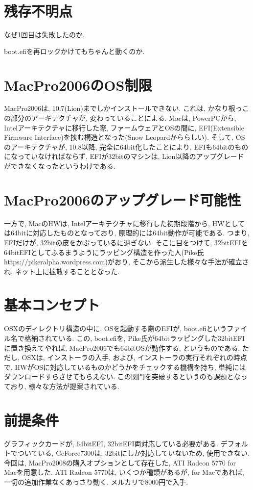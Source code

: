 \documentclass{jsarticle}
\begin{document}
\section{残存不明点}
なぜ1回目は失敗したのか. 

boot.efiを再ロックかけてもちゃんと動くのか. 

\section{MacPro2006のOS制限}
MacPro2006は, 10.7(Lion)までしかインストールできない. これは, かなり根っこの部分のアーキテクチャが, 変わっていることによる. 
Macは, PowerPCから, Intelアーキテクチャに移行した際, ファームウェアとOSの間に, EFI(Extensible Firmware Interface)を挟む構造となった(Snow Leopardかららしい). 
そして, OSのアーキテクチャが, 10.8以降, 完全に64bit化したことにより, EFIも64bitのものになっていなければならず, EFIが32bitのマシンは, Lion以降のアップグレードができなくなったというわけである. 

\section{MacPro2006のアップグレード可能性}
一方で, MacのHWは, Intelアーキテクチャに移行した初期段階から, HWとしては64bitに対応したものとなっており, 原理的には64bit動作が可能である. 
つまり, EFIだけが, 32bitの皮をかぶっているに過ぎない. そこに目をつけて, 32bitEFIを64bitEFIとしてふるまうようにラッピング構造を作った人(Pike氏 https://pikeralpha.wordpress.com)がおり, 
そこから派生した様々な手法が確立され, ネット上に拡散することとなった. 

\section{基本コンセプト}
OSXのディレクトリ構造の中に, OSを起動する際のEFIが, boot.efiというファイル名で格納されている. 
この, boot.efiを, Pike氏が64bitラッピングした32bitEFIに置き換えてやれば, MacPro2006でも64bitOSが動作する, というものである. 
ただし, OSXは, インストーラの入手, および, インストーラの実行それぞれの時点で, HWがOSに対応しているものかどうかをチェックする機構を持ち, 単純にはダウンロードすらさせてもらえない. 
この関門を突破するというのも課題となっており, 様々な方法が提案されている. 

\section{前提条件}
グラフィックカードが, 64bitEFI, 32bitEFI両対応している必要がある. 
デフォルトでついている, GeForce7300は, 32bitにしか対応していないため, 使用できない. 
今回は, MacPro2008の購入オプションとして存在した, ATI Radeon 5770 for Macを用意した. ATI Radeon 5770は, いくつか種類があるが, for Macであれば, 一切の追加作業なくあっさり動く. メルカリで8000円で入手. 
\end{document}
